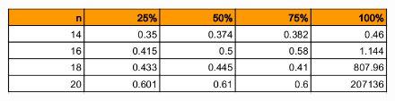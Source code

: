 \documentclass[10pt,a4paper]{article}
\begin{document}
	\begin{figure}[h]
		\begin{center}
		   \includegraphics[scale=0.50]{graficos/tablak13.png}
		\end{center}
	\end{figure}\\
\end{document}
